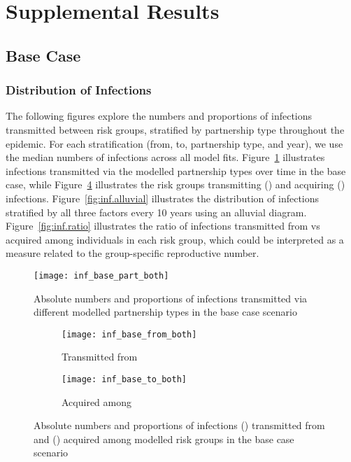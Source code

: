 \section{Supplemental Results}\label{a:res}
\subsection{Base Case}\label{a:res.bc}
\subsubsection{Distribution of Infections}\label{a:res.bc.inf}
The following figures explore the numbers and proportions of infections
transmitted between risk groups, stratified by partnership type throughout the epidemic.
For each stratification (from, to, partnership type, and year),
we use the median numbers of infections across all model fits.
Figure~\ref{fig:inf.part} illustrates
infections transmitted via the modelled partnership types over time in the base case, while
Figure~\ref{fig:inf.frto} illustrates
the risk groups transmitting () and acquiring () infections.
Figure~\ref{fig:inf.alluvial} illustrates the distribution of infections
stratified by all three factors every 10 years using an alluvial diagram.
Figure~\ref{fig:inf.ratio} illustrates
the ratio of infections transmitted from vs acquired among individuals in each risk group,
which could be interpreted as a measure related to the group-specific reproductive number.
\begin{figure}[h]
  \centering
  \texttt{[image: inf\_base\_part\_both]}
  \caption{Absolute numbers and proportions of infections
    transmitted via different modelled partnership types
    in the base case scenario}
  \label{fig:inf.part}
\end{figure}
\begin{figure}[h]
  \begin{subfigure}{.5\linewidth}
    \texttt{[image: inf\_base\_from\_both]}
    \caption{Transmitted from}
    \label{fig:inf.fr}
  \end{subfigure}%
  \begin{subfigure}{.5\linewidth}
    \texttt{[image: inf\_base\_to\_both]}
    \caption{Acquired among}
    \label{fig:inf.to}
  \end{subfigure}
  \caption{Absolute numbers and proportions of infections
    () transmitted from and () acquired among modelled risk groups
    in the base case scenario}
  \label{fig:inf.frto}
\end{figure}
